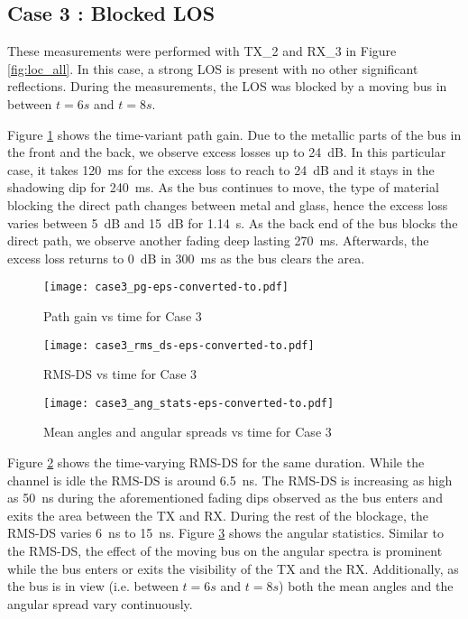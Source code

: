 \documentclass[conference]{IEEEtran}
\begin{document}
\subsection{Case 3 : Blocked LOS}

These measurements were performed with TX\_2 and RX\_3 in Figure \ref{fig:loc_all}. In this case, a strong LOS is present with no other significant reflections. During the measurements, the LOS was blocked by a moving bus in between $t=6s$ and $t=8s$. 

Figure \ref{fig:case3_pg} shows the time-variant path gain. Due to the metallic parts of the bus in the front and the back, we observe excess losses up to \SI{24}{dB}. In this particular case, it takes \SI{120}{ms} for the excess loss to reach to \SI{24}{dB} and it stays in the shadowing dip for \SI{240}{ms}. As the bus continues to move, the type of material blocking the direct path changes between metal and glass, hence the excess loss varies between \SI{5}{dB} and \SI{15}{dB} for \SI{1.14}{s}. As the back end of the bus blocks the direct path, we observe another fading deep lasting \SI{270}{ms}. Afterwards, the excess loss returns to \SI{0}{dB} in \SI{300}{ms} as the bus clears the area.

\begin{figure}[htbp]
        \centering\texttt{[image: case3\_pg-eps-converted-to.pdf]}\caption{Path gain vs time for Case 3}\label{fig:case3_pg}
\end{figure}

\begin{figure}[htbp]
        \centering\texttt{[image: case3\_rms\_ds-eps-converted-to.pdf]}\caption{RMS-DS vs time for Case 3}\label{fig:case3_rms_ds}
\end{figure}

\begin{figure}[htbp]
        \centering\texttt{[image: case3\_ang\_stats-eps-converted-to.pdf]}\caption{Mean angles and angular spreads vs time for Case 3}\label{fig:case3_ang_stats}
\end{figure}

Figure \ref{fig:case3_rms_ds} shows the time-varying RMS-DS for the same duration. While the channel is idle the RMS-DS is around \SI{6.5}{ns}. The RMS-DS is increasing as high as \SI{50}{ns} during the aforementioned fading dips observed as the bus enters and exits the area between the TX and RX. During the rest of the blockage, the RMS-DS varies \SI{6}{ns} to \SI{15}{ns}. Figure \ref{fig:case3_ang_stats} shows the angular statistics. Similar to the RMS-DS, the effect of the moving bus on the angular spectra is prominent while the bus enters or exits the visibility of the TX and the RX. Additionally, as the bus is in view (i.e. between $t=6s$ and $t=8s$) both the mean angles and the angular spread vary continuously.
\end{document}

